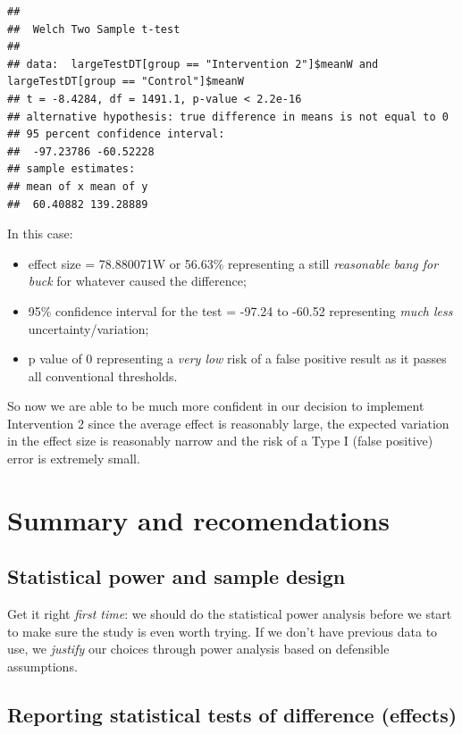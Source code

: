 \documentclass[]{article}
\providecommand{\tightlist}{%
  \setlength{\itemsep}{0pt}\setlength{\parskip}{0pt}}
\theoremstyle{definition}
\theoremstyle{definition}
\theoremstyle{definition}
\theoremstyle{remark}
\begin{document}
\begin{verbatim}
## 
##  Welch Two Sample t-test
## 
## data:  largeTestDT[group == "Intervention 2"]$meanW and largeTestDT[group == "Control"]$meanW
## t = -8.4284, df = 1491.1, p-value < 2.2e-16
## alternative hypothesis: true difference in means is not equal to 0
## 95 percent confidence interval:
##  -97.23786 -60.52228
## sample estimates:
## mean of x mean of y 
##  60.40882 139.28889
\end{verbatim}

In this case:

\begin{itemize}
\tightlist
\item
  effect size = 78.880071W or 56.63\% representing a still
  \emph{reasonable bang for buck} for whatever caused the difference;
\item
  95\% confidence interval for the test = -97.24 to -60.52 representing
  \emph{much less} uncertainty/variation;
\item
  p value of 0 representing a \emph{very low} risk of a false positive
  result as it passes all conventional thresholds.
\end{itemize}

So now we are able to be much more confident in our decision to
implement Intervention 2 since the average effect is reasonably large,
the expected variation in the effect size is reasonably narrow and the
risk of a Type I (false positive) error is extremely small.

\section{Summary and recomendations}\label{summary-and-recomendations}

\subsection{Statistical power and sample
design}\label{statistical-power-and-sample-design}

Get it right \emph{first time}: we should do the statistical power
analysis before we start to make sure the study is even worth trying. If
we don't have previous data to use, we \emph{justify} our choices
through power analysis based on defensible assumptions.

\subsection{Reporting statistical tests of difference
(effects)}\label{reporting-statistical-tests-of-difference-effects}
\end{document}
